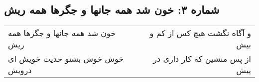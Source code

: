 \begin{center}
\section*{شماره ۳: خون شد همه جانها و جگرها همه ریش}
\label{sec:003}
\begin{longtable}{l p{0.5cm} r}
خون شد همه جانها و جگرها همه ریش
&&
و آگاه نگشت هیچ کس از کم و بیش
\\
خوش خوش بشنو حدیث خویش ای درویش
&&
از پس منشین که کار داری در پیش
\\
\end{longtable}
\end{center}
